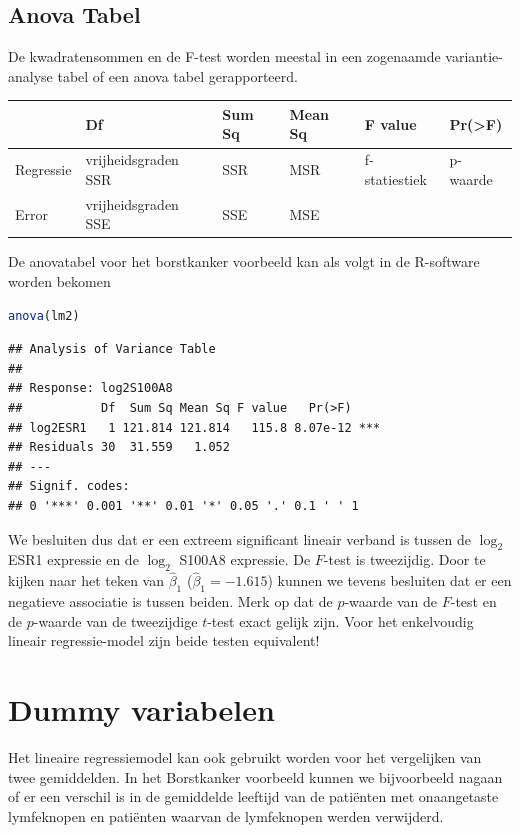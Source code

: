 \documentclass[
  12pt,dutch,coursenotes]{book}
\begin{document}
\hypertarget{anova-tabel}{%
\subsection{Anova Tabel}\label{anova-tabel}}

De kwadratensommen en de F-test worden meestal in een zogenaamde variantie-analyse tabel of een anova tabel gerapporteerd.

\begin{tabular}{l|l|l|l|l|l}
\hline
  & Df & Sum Sq & Mean Sq & F value & Pr(>F)\\
\hline
Regressie & vrijheidsgraden SSR & SSR & MSR & f-statiestiek & p-waarde\\
\hline
Error & vrijheidsgraden SSE & SSE & MSE &  & \\
\hline
\end{tabular}

De anovatabel voor het borstkanker voorbeeld kan als volgt in de R-software worden bekomen

\begin{lstlisting}[language=R]
anova(lm2)
\end{lstlisting}

\begin{lstlisting}
## Analysis of Variance Table
## 
## Response: log2S100A8
##           Df  Sum Sq Mean Sq F value   Pr(>F)    
## log2ESR1   1 121.814 121.814   115.8 8.07e-12 ***
## Residuals 30  31.559   1.052                     
## ---
## Signif. codes:  
## 0 '***' 0.001 '**' 0.01 '*' 0.05 '.' 0.1 ' ' 1
\end{lstlisting}

We besluiten dus dat er een extreem significant lineair verband is tussen de \(\log_2\) ESR1 expressie en de \(\log_2\) S100A8 expressie. De \(F\)-test is tweezijdig. Door te kijken naar het teken van \(\hat\beta_1\) (\(\hat\beta_1=-1.615\)) kunnen we tevens besluiten dat er een negatieve associatie is tussen beiden.
Merk op dat de \(p\)-waarde van de \(F\)-test en de \(p\)-waarde van de tweezijdige \(t\)-test exact gelijk zijn. Voor het enkelvoudig lineair regressie-model zijn beide testen equivalent!

\hypertarget{sec:linDummy}{%
\section{Dummy variabelen}\label{sec:linDummy}}

Het lineaire regressiemodel kan ook gebruikt worden voor het vergelijken van twee gemiddelden.
In het Borstkanker voorbeeld kunnen we bijvoorbeeld nagaan of er een verschil is in de gemiddelde leeftijd van de patiënten met onaangetaste lymfeknopen en patiënten waarvan de lymfeknopen werden verwijderd.
\end{document}
